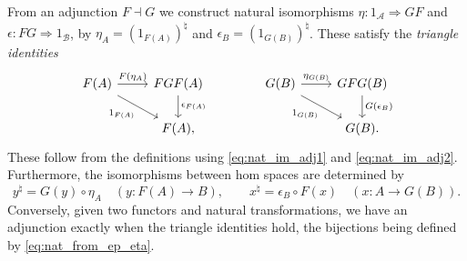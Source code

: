 \documentclass[a4paper,11pt]{article}
\theoremstyle{plain}
\theoremstyle{remark}
\newcommand{\mc}[1]{\mathcal{#1}}
\begin{document}
From an adjunction $F \dashv G$ we construct natural isomorphisms $\eta \colon 1_{\mc A} \Rightarrow GF$ and $\epsilon \colon FG \Rightarrow 1_{\mc B}$, by $\eta_A = (1_{F(A)})^\natural$ and $\epsilon_B = (1_{G(B)})^\natural$.  These satisfy the \emph{triangle identities}
\begin{equation} \begin{tikzcd}
  F(A) \arrow[r, "F(\eta_A)"] \arrow[rd, "1_{F(A)}"']  &  FGF(A) \arrow[d, "\epsilon_{F(A)}"] \\
  &  F(A),
\end{tikzcd} 
\qquad\qquad
\begin{tikzcd}
  G(B) \arrow[r, "\eta_{G(B)}"] \arrow[rd, "1_{G(B)}"']  &  GFG(B) \arrow[d, "G(\epsilon_B)"] \\
  &  G(B).
\end{tikzcd} 
\label{eq:triangle_iden} \end{equation}
These follow from the definitions using \eqref{eq:nat_im_adj1} and \eqref{eq:nat_im_adj2}.
Furthermore, the isomorphisms between hom spaces are determined by
\begin{equation} y^\natural = G(y)\circ \eta_A \quad (y \colon F(A)\to B),
\qquad
x^\natural = \epsilon_B \circ F(x) \quad (x\colon A\to G(B)).
\label{eq:nat_from_ep_eta}
\end{equation}
Conversely, given two functors and natural transformations, we have an adjunction exactly when the triangle identities hold, the bijections being defined by \eqref{eq:nat_from_ep_eta}.
\end{document}
